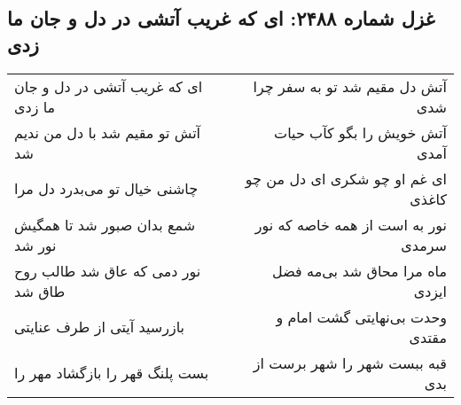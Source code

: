 \begin{center}
\section*{غزل شماره ۲۴۸۸: ای که غریب آتشی در دل و جان ما زدی}
\label{sec:2488}
\begin{longtable}{l p{0.5cm} r}
ای که غریب آتشی در دل و جان ما زدی
&&
آتش دل مقیم شد تو به سفر چرا شدی
\\
آتش تو مقیم شد با دل من ندیم شد
&&
آتش خویش را بگو کآب حیات آمدی
\\
چاشنی خیال تو می‌بدرد دل مرا
&&
ای غم او چو شکری ای دل من چو کاغذی
\\
شمع بدان صبور شد تا همگیش نور شد
&&
نور به است از همه خاصه که نور سرمدی
\\
نور دمی که عاق شد طالب روح طاق شد
&&
ماه مرا محاق شد بی‌مه فضل ایزدی
\\
بازرسید آیتی از طرف عنایتی
&&
وحدت بی‌نهایتی گشت امام و مقتدی
\\
بست پلنگ قهر را بازگشاد مهر را
&&
قبه ببست شهر را شهر برست از بدی
\\
\end{longtable}
\end{center}
